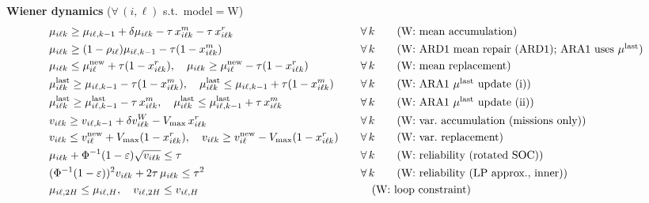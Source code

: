 \documentclass[11pt,a4paper]{article}
\begin{document}
\begin{small}
\vspace{0.3em}
\noindent\textbf{Wiener dynamics} ($\forall\,(i,\ell)$ s.t.\ model$=$W)
\begin{alignat}{2}
  &\mu_{i\ell k} \geq \mu_{i\ell,k-1} + \delta\mu_{i\ell k} - \tau\,x^m_{i\ell k}
    - \tau\,x^r_{i\ell k}
  &&\quad\forall\,k \tag{W: mean accumulation} \\
  &\mu_{i\ell k} \geq (1-\rho_{i\ell})\mu_{i\ell,k-1} - \tau(1-x^m_{i\ell k})
  &&\quad\forall\,k \tag{W: ARD1 mean repair (ARD1); ARA1 uses $\mu^{\mathrm{last}}$} \\
  &\mu_{i\ell k} \leq \mu^{\mathrm{new}}_{i\ell} + \tau(1-x^r_{i\ell k}),\quad
   \mu_{i\ell k} \geq \mu^{\mathrm{new}}_{i\ell} - \tau(1-x^r_{i\ell k})
  &&\quad\forall\,k \tag{W: mean replacement} \\
  &\mu^{\mathrm{last}}_{i\ell k} \geq \mu_{i\ell,k-1} - \tau(1-x^m_{i\ell k}),\quad
   \mu^{\mathrm{last}}_{i\ell k} \leq \mu_{i\ell,k-1} + \tau(1-x^m_{i\ell k})
  &&\quad\forall\,k \tag{W: ARA1 $\mu^{\mathrm{last}}$ update (i)} \\
  &\mu^{\mathrm{last}}_{i\ell k} \geq \mu^{\mathrm{last}}_{i\ell,k-1} - \tau\,x^m_{i\ell k},\quad
   \mu^{\mathrm{last}}_{i\ell k} \leq \mu^{\mathrm{last}}_{i\ell,k-1} + \tau\,x^m_{i\ell k}
  &&\quad\forall\,k \tag{W: ARA1 $\mu^{\mathrm{last}}$ update (ii)} \\
  &v_{i\ell k} \geq v_{i\ell,k-1} + \delta v^W_{i\ell k} - V_{\max}\,x^r_{i\ell k}
  &&\quad\forall\,k \tag{W: var.\ accumulation (missions only)} \\
  &v_{i\ell k} \leq v^{\mathrm{new}}_{i\ell} + V_{\max}(1-x^r_{i\ell k}),\quad
   v_{i\ell k} \geq v^{\mathrm{new}}_{i\ell} - V_{\max}(1-x^r_{i\ell k})
  &&\quad\forall\,k \tag{W: var.\ replacement} \\
  &\mu_{i\ell k} + \Phi^{-1}(1-\varepsilon)\sqrt{v_{i\ell k}} \leq \tau
  &&\quad\forall\,k \tag{W: reliability (rotated SOC)} \\
  &(\Phi^{-1}(1-\varepsilon))^2 v_{i\ell k} + 2\tau\,\mu_{i\ell k} \leq \tau^2
  &&\quad\forall\,k \tag{W: reliability (LP approx., inner)} \\
  &\mu_{i\ell,2H} \leq \mu_{i\ell,H},\quad v_{i\ell,2H} \leq v_{i\ell,H}
  &&\tag{W: loop constraint}
\end{alignat}


\end{small}
\end{document}
